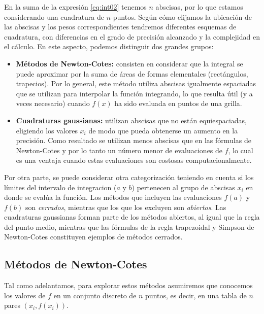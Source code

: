 En la suma de la expresión \eqref{eq:int02} tenemos $n$ abscisas, por lo que estamos considerando una cuadratura de $n$-puntos. Según cómo elijamos la ubicación de las abscisas y los pesos correspondientes tendremos diferentes esquemas de cuadratura, con diferencias en el grado de precisión alcanzado y la complejidad en el cálculo. En este aspecto, podemos distinguir dos grandes grupos:
\begin{itemize}
 \item \textbf{Métodos de Newton-Cotes:} consisten en considerar que la integral se puede aproximar por la suma de áreas de formas elementales (rectángulos, trapecios). Por lo general, este método utiliza abscisas igualmente espaciadas que se utilizan para interpolar la función integrando, lo que resulta útil (y a veces necesario) cuando $f(x)$ ha sido evaluada en puntos de una grilla.
 \item \textbf{Cuadraturas gaussianas:} utilizan abscisas que no están equiespaciadas, eligiendo los valores $x_i$ de modo que pueda obtenerse un aumento en la precisión. Como resultado se utilizan menos abscisas que en las fórmulas de Newton-Cotes y por lo tanto un número menor de evaluaciones de $f$, lo cual es una ventaja cuando estas evaluaciones son costosas computacionalmente.
\end{itemize}

Por otra parte, se puede considerar otra categorización teniendo en cuenta si los límites del intervalo de integracion ($a$ y $b$) pertenecen al grupo de abscisas $x_i$ en donde se evalúa la función. Los métodos que incluyen las evaluaciones $f(a)$ y $f(b)$ son \textit{cerrados}, mientras que los que los excluyen son \textit{abiertos}. Las cuadraturas gaussianas forman parte de los métodos abiertos, al igual que la regla del punto medio, mientras que las fórmulas de la regla trapezoidal y Simpson de Newton-Cotes constituyen ejemplos de métodos cerrados.


\subsection{Métodos de Newton-Cotes}
Tal como adelantamos, para explorar estos métodos asumiremos que conocemos los valores de $f$ en un conjunto discreto de $n$ puntos, es decir, en una tabla de $n$ pares $(x_i, f(x_i))$.


